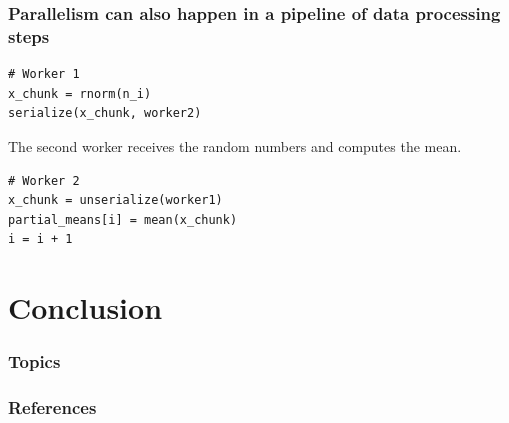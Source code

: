 \documentclass{beamer}
\begin{document}
\begin{frame}[fragile]

    \frametitle{Parallelism can also happen in a pipeline of data
    processing steps}

\begin{verbatim}
# Worker 1
x_chunk = rnorm(n_i)
serialize(x_chunk, worker2)
\end{verbatim}

The second worker receives the random numbers and computes the mean.

\begin{verbatim}
# Worker 2
x_chunk = unserialize(worker1)
partial_means[i] = mean(x_chunk)
i = i + 1
\end{verbatim}



\end{frame}
\section{Conclusion}
\begin{frame}


\frametitle{Topics}

\end{frame}

\begin{frame}[t,allowframebreaks]
\frametitle{References}
\printbibliography
\end{frame}
\end{document}
